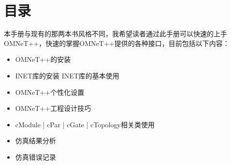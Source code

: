 \section{目录}

本手册与现有的那两本书风格不同，我希望读者通过此手册可以快速的上手OMNeT++，快速的掌握OMNeT++提供的各种接口，目前包括以下内容：

\begin{itemize}
	\item OMNeT++的安装
	\item INET库的安装 INET库的基本使用
	\item OMNeT++个性化设置
	\item OMNeT++工程设计技巧
	\item cModule | cPar | cGate | cTopology相关类使用
	\item 仿真结果分析
	\item 仿真错误记录
\end{itemize}



